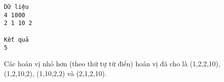 \begin{verbatim}
Dữ liệu
4 1000 
2 1 10 2 

Kết quả
5
\end{verbatim}

   Các hoán vị nhỏ hơn (theo thứ tự từ điển) hoán vị đã cho là (1,2,2,10), (1,2,10,2), (1,10,2,2) và (2,1,2,10).
